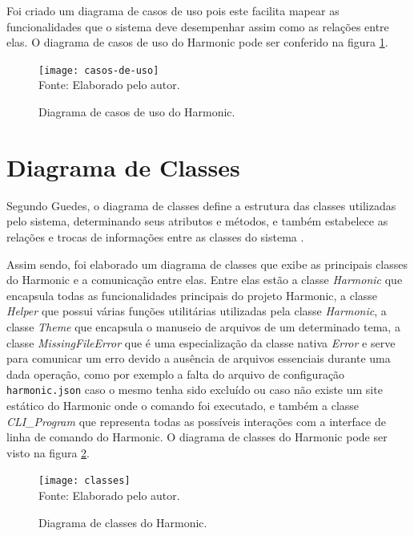 \documentclass[ppginf, pep]{esinucpel}
\newcommand{\code}[1]{\texttt{#1}}
\begin{document}
Foi criado um diagrama de casos de uso pois este facilita mapear as funcionalidades que o sistema deve desempenhar assim como as relações entre elas. O diagrama de casos de uso do Harmonic pode ser conferido na figura \ref{fig:casos_de_uso}.

\begin{figure}[H]
    \centering
    \caption{Diagrama de casos de uso do Harmonic.}
    \vspace{5pt}
    \texttt{[image: casos-de-uso]}
    \\Fonte: Elaborado pelo autor.
    \label{fig:casos_de_uso}
\end{figure}

\section{Diagrama de Classes}

Segundo Guedes, o diagrama de classes define a estrutura das classes utilizadas pelo sistema, determinando seus atributos e métodos, e também estabelece as relações
e trocas de informações entre as classes do sistema \cite{uml}.

Assim sendo, foi elaborado um diagrama de classes que exibe as principais classes do Harmonic e a comunicação entre elas. Entre elas estão a classe  \textit{Harmonic} que encapsula todas as funcionalidades principais do projeto Harmonic, a classe  \textit{Helper} que possui várias funções utilitárias utilizadas pela classe  \textit{Harmonic}, a classe \textit{Theme} que encapsula o manuseio de arquivos de um determinado tema, a classe \textit{MissingFileError} que é uma especialização da classe nativa \textit{Error} e serve para comunicar um erro devido a ausência de arquivos essenciais durante uma dada operação, como por exemplo a falta do arquivo de configuração \code{harmonic.json} caso o mesmo tenha sido excluído ou caso não existe um site estático do Harmonic onde o comando foi executado, e também a classe \textit{CLI\_Program} que representa todas as possíveis interações com a interface de linha de comando do Harmonic. O diagrama de classes do Harmonic pode ser visto na figura \ref{fig:classes}.

\begin{figure}[htbp]
    \centering
    \caption{Diagrama de classes do Harmonic.}
    \vspace{5pt}
    \hspace*{-1.5cm}
    \texttt{[image: classes]}
    \\Fonte: Elaborado pelo autor.
    \label{fig:classes}
\end{figure}
\end{document}

